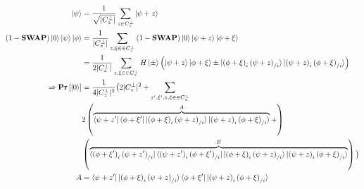 \documentclass[manuscript,screen,review]{acmart}
\begin{document}
\begin{equation*}
  \begin{split}
    \ket{\psi} & = \frac{1}{\sqrt{|C_{z}^{\perp}|}}\sum_{z \in C_{z}^{\perp}}{ \ket{\psi + z   }} \\ 
    (1-\mathbf{SWAP})\ket{0}\ket{\psi}\ket{\phi} &= \frac{1}{|C_{z}^{\perp}|}\sum_{z,\xi \in  \in C_{z}^{\perp} }{(1-\mathbf{SWAP})\ket{0} \ket{\psi + z   }\ket{\phi + \xi   }}\\
    & = \frac{1}{2|C_{z}^{\perp}|}\sum_{z,\xi \in  \in C_{z}^{\perp} }{  H\ket{\pm} \left( \ket{\psi + z   }\ket{\phi + \xi   }  \pm  \ket{  \left( \phi + \xi \right)_{ i }\left( \psi + z \right)_{ / i }   }\ket{\left( \psi + z \right)_{ i }\left( \phi + \xi \right)_{ / i }  }  \right) }\\
    \Rightarrow \mathbf{Pr} \left[ { \ket{0} } \right] &=  \frac{1}{4|C_{z}^{\perp}|^{2}} \big(  2 |C_{z}^{\perp}|^{2} + \sum_{z^{\prime},\xi^{\prime},  z,\xi \in  \in C_{z}^{\perp} }   \\
    & 2\left( \overbrace{    \bra{\psi + z^{\prime}   }\bra{\phi + \xi^{\prime}   } \ket{  \left( \phi + \xi \right)_{ i }\left( \psi + z \right)_{ / i }   }\ket{\left( \psi + z \right)_{ i }\left( \phi + \xi \right)_{ / i }  }}^{A}+  \right) \\
  &  \left(  \overbrace{ \bra{  \left( \phi + \xi^{\prime} \right)_{ i }\left( \psi + z^{\prime} \right)_{ / i }   }\bra{\left( \psi + z^{\prime} \right)_{ i }\left( \phi + \xi^{\prime} \right)_{ / i }  }  \ket{  \left( \phi + \xi \right)_{ i }\left( \psi + z \right)_{ / i }   }\ket{\left( \psi + z \right)_{ i }\left( \phi + \xi \right)_{ / i }  } }^{B} \right) \big) \\ 
    A &=     \bra{\psi + z^{\prime}   }\ket{  \left( \phi + \xi \right)_{ i }\left( \psi + z \right)_{ / i }   } \bra{\phi + \xi^{\prime}   } \ket{\left( \psi + z \right)_{ i }\left( \phi + \xi \right)_{ / i }  }  
  \end{split}
\end{equation*}


\printbibliography
\end{document}
